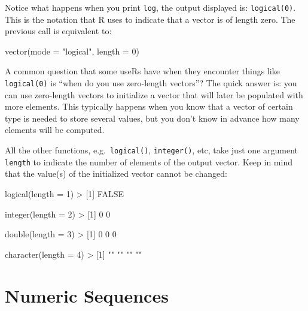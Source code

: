 \documentclass[
]{book}
\newenvironment{Shaded}{\begin{snugshade}}{\end{snugshade}}
\newcommand{\AttributeTok}[1]{\textcolor[rgb]{0.77,0.63,0.00}{#1}}
\newcommand{\ConstantTok}[1]{\textcolor[rgb]{0.00,0.00,0.00}{#1}}
\newcommand{\DecValTok}[1]{\textcolor[rgb]{0.00,0.00,0.81}{#1}}
\newcommand{\FunctionTok}[1]{\textcolor[rgb]{0.00,0.00,0.00}{#1}}
\newcommand{\NormalTok}[1]{#1}
\newcommand{\SpecialCharTok}[1]{\textcolor[rgb]{0.00,0.00,0.00}{#1}}
\newcommand{\StringTok}[1]{\textcolor[rgb]{0.31,0.60,0.02}{#1}}
\begin{document}
Notice what happens when you print \texttt{log}, the output displayed is: \texttt{logical(0)}.
This is the notation that R uses to indicate that a vector is of length zero.
The previous call is equivalent to:

\begin{Shaded}
\begin{Highlighting}[]
\FunctionTok{vector}\NormalTok{(}\AttributeTok{mode =} \StringTok{"logical"}\NormalTok{, }\AttributeTok{length =} \DecValTok{0}\NormalTok{)}
\end{Highlighting}
\end{Shaded}

A common question that some useRs have when they encounter things like
\texttt{logical(0)} is ``when do you use zero-length vectors''? The quick answer is:
you can use zero-length vectors to initialize a vector that will later be
populated with more elements. This typically happens when you know that a
vector of certain type is needed to store several values, but you don't know
in advance how many elements will be computed.

All the other functions, e.g.~\texttt{logical()}, \texttt{integer()}, etc, take just one
argument \texttt{length} to indicate the number of elements of the output vector.
Keep in mind that the value(s) of the initialized vector cannot be changed:

\begin{Shaded}
\begin{Highlighting}[]
\FunctionTok{logical}\NormalTok{(}\AttributeTok{length =} \DecValTok{1}\NormalTok{)}
\SpecialCharTok{\textgreater{}}\NormalTok{ [}\DecValTok{1}\NormalTok{] }\ConstantTok{FALSE}

\FunctionTok{integer}\NormalTok{(}\AttributeTok{length =} \DecValTok{2}\NormalTok{)}
\SpecialCharTok{\textgreater{}}\NormalTok{ [}\DecValTok{1}\NormalTok{] }\DecValTok{0} \DecValTok{0}

\FunctionTok{double}\NormalTok{(}\AttributeTok{length =} \DecValTok{3}\NormalTok{)}
\SpecialCharTok{\textgreater{}}\NormalTok{ [}\DecValTok{1}\NormalTok{] }\DecValTok{0} \DecValTok{0} \DecValTok{0}

\FunctionTok{character}\NormalTok{(}\AttributeTok{length =} \DecValTok{4}\NormalTok{)}
\SpecialCharTok{\textgreater{}}\NormalTok{ [}\DecValTok{1}\NormalTok{] }\StringTok{""} \StringTok{""} \StringTok{""} \StringTok{""}
\end{Highlighting}
\end{Shaded}

\hypertarget{numeric-sequences}{%
\section{Numeric Sequences}\label{numeric-sequences}}
\end{document}
